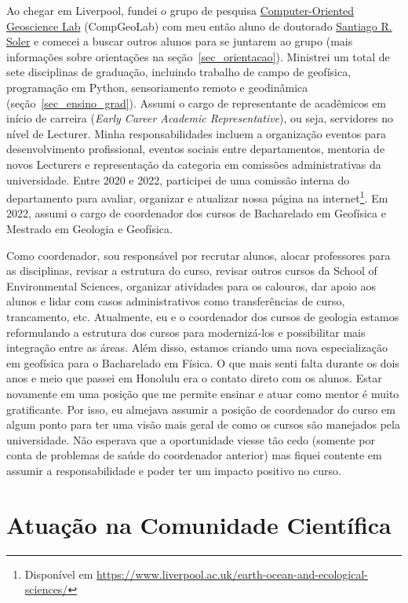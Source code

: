 \documentclass[10pt,a4paper,oneside]{book}
\newcommand{\SantiagoLink}{\href{https://www.santisoler.com/}{Santiago R. Soler}}
\begin{document}
Ao chegar em Liverpool, fundei o grupo de pesquisa
\href{https://www.compgeolab.org/}{Computer-Oriented Geoscience Lab} (CompGeoLab)
com meu então aluno de doutorado
\SantiagoLink{} e comecei a buscar outros
alunos para se juntarem ao grupo (mais informações sobre orientações na
seção~\ref{sec_orientacao}).
Ministrei um total de sete disciplinas de graduação, incluindo trabalho de
campo de geofísica, programação em Python, sensoriamento remoto e geodinâmica
(seção~\ref{sec_ensino_grad}).
Assumi o cargo de representante de acadêmicos em início de carreira
(\textit{Early Career Academic Representative}), ou seja, servidores no nível de
Lecturer.
Minha responsabilidades incluem a organização eventos para desenvolvimento
profissional, eventos sociais entre departamentos, mentoria de novos Lecturers
e representação da categoria em comissões administrativas da universidade.
Entre 2020 e 2022, participei de uma comissão interna do departamento para
avaliar, organizar e atualizar nossa página na internet\footnote{Disponível em
\url{https://www.liverpool.ac.uk/earth-ocean-and-ecological-sciences/}}.
Em 2022, assumi o cargo de coordenador dos cursos de Bacharelado em Geofísica
e Mestrado em Geologia e Geofísica.

Como coordenador, sou responsável por recrutar alunos, alocar professores para
as disciplinas, revisar a estrutura do curso, revisar outros cursos da School
of Environmental Sciences, organizar atividades para os calouros, dar apoio aos
alunos e lidar com casos administrativos como transferências de curso,
trancamento, etc.
Atualmente, eu e o coordenador dos cursos de geologia estamos reformulando a
estrutura dos cursos para modernizá-los e possibilitar mais integração entre as
áreas.
Além disso, estamos criando uma nova especialização em geofísica para o
Bacharelado em Física.
O que mais senti falta durante os dois anos e meio que passei em Honolulu era
o contato direto com os alunos.
Estar novamente em uma posição que me permite ensinar e atuar como mentor é
muito gratificante.
Por isso, eu almejava assumir a posição de coordenador do curso em algum ponto
para ter uma visão mais geral de como os cursos são manejados pela
universidade.
Não esperava que a oportunidade viesse tão cedo (somente por conta de problemas
de saúde do coordenador anterior) mas fiquei contente em assumir a
responsabilidade e poder ter um impacto positivo no curso.


\section{Atuação na Comunidade Científica}
\label{sec_comunidade}
\end{document}
